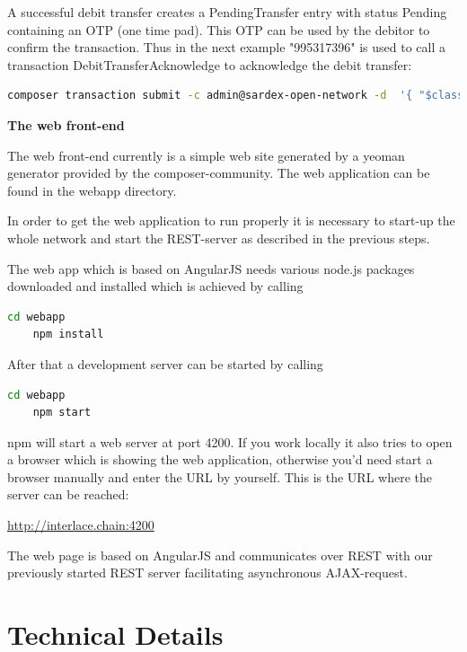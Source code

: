 A successful debit transfer creates a PendingTransfer entry with status Pending containing an OTP (one time pad). This OTP can be used by the debitor to confirm the transaction. Thus in the next example "995317396" is used to call a transaction DebitTransferAcknowledge to acknowledge the debit transfer:

\begin{lstlisting}[language=bash]
	composer transaction submit -c admin@sardex-open-network -d  '{ "$class": "net.sardex.interlace.DebitTransferAcknowledge", "transfer": "resource:net.sardex.interlace.PendingTransfer#995317396" }'
\end{lstlisting}

\textbf{The web front-end}

The web front-end currently is a simple web site generated by a yeoman generator provided by the composer-community. The web application can be found in the webapp directory.

In order to get the web application to run properly it is necessary to start-up the whole network and start the REST-server as described in the previous steps.

The web app which is based on AngularJS needs various node.js packages downloaded and installed which is achieved by calling

\begin{lstlisting}[language=bash]
	cd webapp
	npm install
\end{lstlisting}

After that a development server can be started by calling

\begin{lstlisting}[language=bash]
	cd webapp
	npm start
\end{lstlisting}

npm will start a web server at port 4200. If you work locally it also tries to open a browser which is showing the web application, otherwise you'd need start a browser manually and enter the URL by yourself. This is the URL where the server can be reached:

\url{http://interlace.chain:4200}

The web page is based on AngularJS and communicates over REST with our previously started REST server facilitating asynchronous AJAX-request.

\section{Technical Details}


